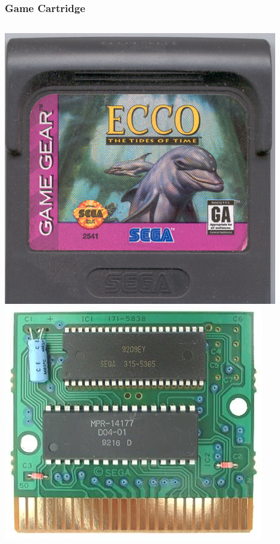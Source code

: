 \documentclass{beamer}
\begin{document}
\begin{frame}
    \frametitle{Game Cartridge}

    \begin{columns}[c]
            \includegraphics[width=\textwidth]{../images/gg_cart.png}
            \includegraphics[width=\textwidth]{../images/gg_cart_pcb.png}
    \end{columns}
\end{frame}
\end{document}
